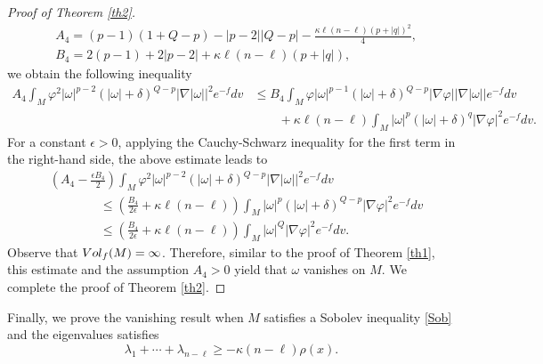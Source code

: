 \documentclass[10pt,a4paper]{amsart}
\numberwithin{equation}{section}
\begin{document}
\begin{proof}[Proof of Theorem \ref{th2}]
	\begin{align*}
		&A_4=(p-1)(1+Q-p)-|p-2||Q-p|-\frac{\kappa \ell (n-\ell)(p+|q|)^2}{4},\\
		&B_4=2(p-1)+2|p-2|+\kappa \ell (n-\ell)(p+|q|),
	\end{align*}
	we obtain the following inequality
	\begin{align*}\nonumber
		A_4 \int_M \varphi^2 |\omega|^{p-2} (|\omega|+\delta)^{Q-p}|\nabla|\omega||^2 e^{-f}dv & \le B_4 \int_M \varphi |\omega|^{p-1} (|\omega|+\delta)^{Q-p}|\nabla \varphi||\nabla|\omega||e^{-f}dv\\
		&\qquad +\kappa \ell (n-\ell)\int_M |\omega|^p (|\omega|+\delta)^q |\nabla \varphi|^2 e^{-f}dv.
	\end{align*}
	For a constant $\epsilon>0$, applying the Cauchy-Schwarz inequality for the first term in the right-hand side, the above estimate leads to
	\begin{align}\nonumber
		&\left(A_4-\frac{\epsilon B_4}{2}\right) \int_M \varphi^2 |\omega|^{p-2}(|\omega|+\delta)^{Q-p}|\nabla|\omega||^2 e^{-f}dv \\ \nonumber
		&\qquad\qquad\le \left( \frac{B_4}{2\epsilon}+\kappa \ell (n-\ell) \right)\int_M |\omega|^{p} (|\omega|+\delta)^{Q-p}|\nabla \varphi|^2e^{-f}dv\\ \nonumber
		&\qquad\qquad\le \left( \frac{B_4}{2\epsilon}+\kappa \ell (n-\ell) \right) \int_M |\omega|^{Q} |\nabla \varphi|^2e^{-f}dv.
	\end{align}
	Observe that  $\rm{Vol}_f(M)=\infty$. Therefore, similar to the proof of Theorem \ref{th1}, this estimate and the assumption $A_4>0$ yield that $\omega$ vanishes on $M$. We complete the proof of Theorem \ref{th2}.
\end{proof}
	
	Finally, we prove the vanishing result when $M$ satisfies a Sobolev inequality \eqref{Sob} and the eigenvalues satisfies $$\lambda_1+\cdots+\lambda_{n-\ell}\ge -\kappa(n-\ell)\rho(x).$$	
\end{document}
